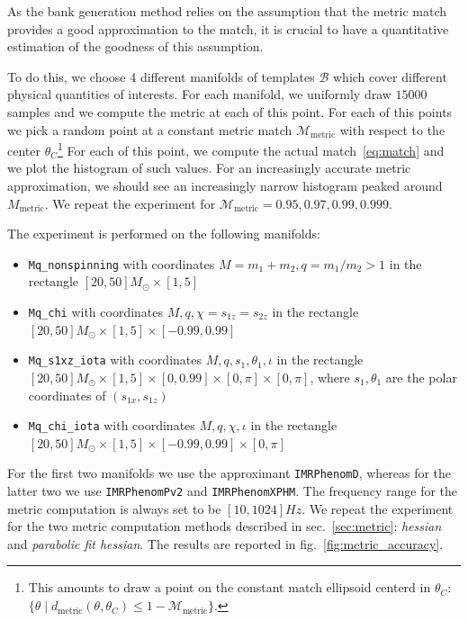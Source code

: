 \documentclass[twocolumn,showpacs,preprintnumbers,nofootinbib,prd,
superscriptaddress,10pt]{revtex4-2}
\begin{document}
As the bank generation method relies on the assumption that the metric match provides a good approximation to the match, it is crucial to have a quantitative estimation of the goodness of this assumption.

To do this, we choose 4 different manifolds of templates $\mathcal{B}$ which cover different physical quantities of interests. For each manifold, we uniformly draw $15000$ samples and we compute the metric at each of this point.
For each of this points we pick a random point at a constant metric match $\mathcal{M}_{\text{metric}}$ with respect to the center $\theta_C$\footnote{
This amounts to draw a point on the constant match ellipsoid centerd in
$\theta_C$: $\{\theta \; | \; d_{\text{metric}}(\theta,\theta_C) \leq 1-\mathcal{M}_{\text{metric}} \}$.
}
For each of this point, we compute the actual match~\eqref{eq:match} and we plot the histogram of such values. For an increasingly accurate metric approximation, we should see an increasingly narrow histogram peaked around $M_{\text{metric}}$.
We repeat the experiment for $\mathcal{M}_{\text{metric}} = 0.95, 0.97, 0.99, 0.999$.

The experiment is performed on the following manifolds:
\begin{itemize}
	\item \texttt{Mq\_nonspinning} with coordinates $M = m_1+m_2, q = m_1/m_2>1$ in the rectangle $[20, 50] M_\odot \times [1,5]$
	\item \texttt{Mq\_chi} with coordinates $M, q, \chi = s_{1z} = s_{2z}$ in the rectangle $[20, 50] M_\odot \times [1,5] \times [-0.99, 0.99]$
	\item \texttt{Mq\_s1xz\_iota} with coordinates $M, q, s_{1}, \theta_1, \iota$ in the rectangle $[20, 50] M_\odot \times [1,5] \times [0, 0.99] \times [0,\pi]  \times [0,\pi]$, where $s_1, \theta_1$ are the polar coordinates of $(s_{1x}, s_{1z})$
	\item \texttt{Mq\_chi\_iota} with coordinates $M, q, \chi, \iota$ in the rectangle $[20, 50] M_\odot \times [1,5] \times [-0.99, 0.99] \times [0,\pi]$
\end{itemize}

For the first two manifolds we use the approximant \texttt{IMRPhenomD}, whereas for the latter two we use \texttt{IMRPhenomPv2} and \texttt{IMRPhenomXPHM}. The frequency range for the metric computation is always set to be $[10, 1024]Hz$.
We repeat the experiment for the two metric computation methods described in sec.~\ref{sec:metric}: {\it hessian} and {\it parabolic fit hessian}.
The results are reported in fig.~\ref{fig:metric_accuracy}.
\end{document}
